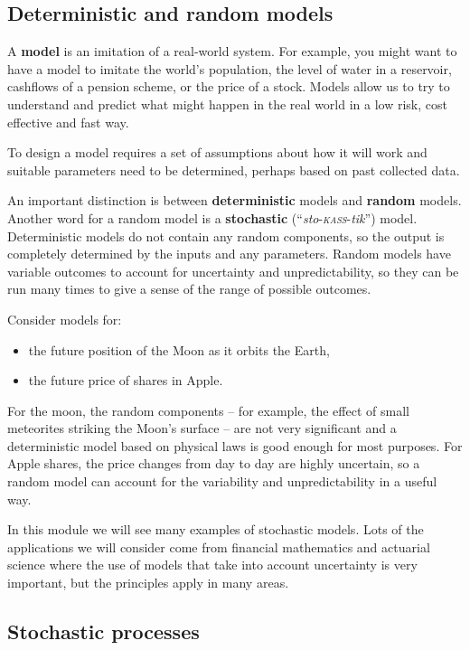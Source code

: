 \documentclass[
  a4paper,
]{article}
\providecommand{\tightlist}{%
  \setlength{\itemsep}{0pt}\setlength{\parskip}{0pt}}
\theoremstyle{definition}
\theoremstyle{definition}
\theoremstyle{definition}
\theoremstyle{remark}
\begin{document}
\hypertarget{models}{%
\subsection{Deterministic and random models}\label{models}}

A \textbf{model} is an imitation of a real-world system. For example, you might want to have a model to imitate the world's population, the level of water in a reservoir, cashflows of a pension scheme, or the price of a stock. Models allow us to try to understand and predict what might happen in the real world in a low risk, cost effective and fast way.

To design a model requires a set of assumptions about how it will work and suitable parameters need to be determined, perhaps based on past collected data.

An important distinction is between \textbf{deterministic} models and \textbf{random} models. Another word for a random model is a \textbf{stochastic} (``\emph{sto}-\textsc{\emph{kass}}-\emph{tik}'') model. Deterministic models do not contain any random components, so the output is completely determined by the inputs and any parameters. Random models have variable outcomes to account for uncertainty and unpredictability, so they can be run many times to give a sense of the range of possible outcomes.

Consider models for:

\begin{itemize}
\tightlist
\item
  the future position of the Moon as it orbits the Earth,
\item
  the future price of shares in Apple.
\end{itemize}

For the moon, the random components -- for example, the effect of small meteorites striking the Moon's surface -- are not very significant and a deterministic model based on physical laws is good enough for most purposes. For Apple shares, the price changes from day to day are highly uncertain, so a random model can account for the variability and unpredictability in a useful way.

In this module we will see many examples of stochastic models. Lots of the applications we will consider come from financial mathematics and actuarial science where the use of models that take into account uncertainty is very important, but the principles apply in many areas.

\hypertarget{stochastic-processes}{%
\subsection{Stochastic processes}\label{stochastic-processes}}
\end{document}
